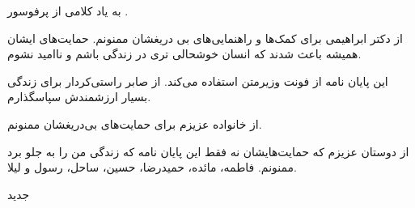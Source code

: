 


\begin{center}
\end{center}

به یاد کلامی از پرفوسور
.

از دکتر ابراهیمی برای کمک‌ها و راهنمایی‌های بی دریغشان ممنونم. حمایت‌های ایشان همیشه باعث شدند که انسان خوشحالی تری در زندگی باشم و ناامید نشوم.

این پایان نامه از فونت وزیرمتن استفاده می‌کند. از صابر راستی‌کردار برای زندگی بسیار ارزشمندش سپاسگذارم.

از خانواده عزیزم برای حمایت‌های بی‌دریغشان ممنونم.

از دوستان عزیزم که حمایت‌هایشان نه فقط این پایان نامه که زندگی من را به جلو برد ممنونم. فاطمه، مائده، حمیدرضا، حسین، ساحل، رسول و لیلا.

‌جدید
